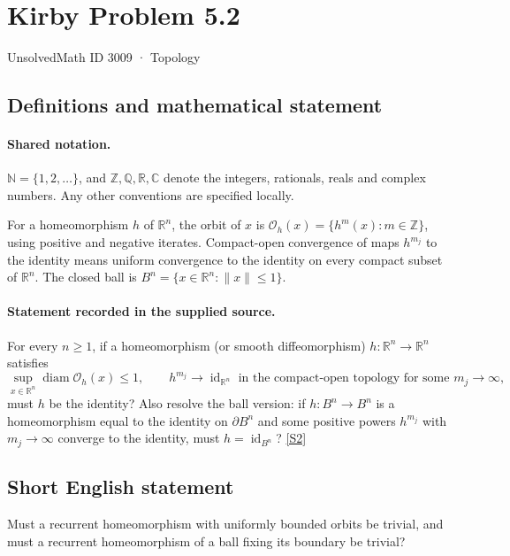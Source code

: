 \documentclass[11pt]{article}
\newcommand{\sref}[2]{\hyperlink{source:#1:#2}{[S#2]}}
\begin{document}
\setcounter{section}{3008}
\section{Kirby Problem 5.2}\label{3009}
{\small\sffamily UnsolvedMath ID 3009 · Topology}
\subsection{Definitions and mathematical statement}

\paragraph{Shared notation.}$\mathbb N=\{1,2,\ldots\}$, and $\mathbb Z,\mathbb Q,\mathbb R,\mathbb C$ denote the integers, rationals, reals and complex numbers. Any other conventions are specified locally.


For a homeomorphism $h$ of $\mathbb R^n$, the orbit of $x$ is $\mathcal O_h(x)=\{h^m(x):m\in\mathbb Z\}$, using positive and negative iterates. Compact-open convergence of maps $h^{m_j}$ to the identity means uniform convergence to the identity on every compact subset of $\mathbb R^n$. The closed ball is $B^n=\{x\in\mathbb R^n:\|x\|\leq1\}$.
\paragraph{Statement recorded in the supplied source.}
For every $n\geq1$, if a homeomorphism (or smooth diffeomorphism) $h:\mathbb R^n\to\mathbb R^n$ satisfies
\[
 \sup_{x\in\mathbb R^n}\operatorname{diam}\mathcal O_h(x)\leq1,
 \qquad h^{m_j}\longrightarrow\operatorname{id}_{\mathbb R^n}
 \text{ in the compact-open topology for some }m_j\to\infty,
\]
must $h$ be the identity? Also resolve the ball version: if $h:B^n\to B^n$ is a homeomorphism equal to the identity on $\partial B^n$ and some positive powers $h^{m_j}$ with $m_j\to\infty$ converge to the identity, must $h=\operatorname{id}_{B^n}$? \sref{3009}{2}
\subsection{Short English statement}
Must a recurrent homeomorphism with uniformly bounded orbits be trivial, and must a recurrent homeomorphism of a ball fixing its boundary be trivial?
\end{document}
